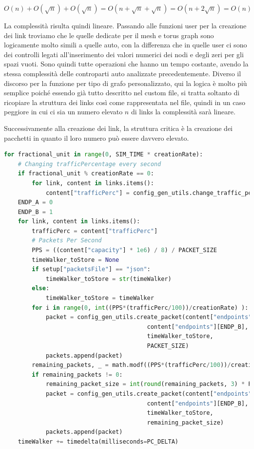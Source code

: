 \documentclass[binding=0.6cm]{sapthesis}
\begin{document}
\[
    O(n) + O(\sqrt{n}) + O(\sqrt{n}) = O(n + \sqrt{n} + \sqrt{n}) = O(n + 2\sqrt{n}) = O(n)
\]

La complessità risulta quindi lineare.
Passando alle funzioni user per la creazione dei link troviamo che le quelle dedicate per il mesh e torus graph sono logicamente molto simili a quelle auto, con
la differenza che in quelle user ci sono dei controlli legati all'inserimento dei valori numerici dei nodi e degli zeri per gli spazi vuoti. Sono quindi tutte operazioni che hanno un tempo costante,
avendo la stessa complessità delle controparti auto analizzate precedentemente.
Diverso il discorso per la funzione per tipo di grafo personalizzato, qui la logica è molto più semplice
poiché essendo già tutto descritto nel custom file, si tratta soltanto di ricopiare la struttura dei links così come rappresentata nel file,
quindi in un caso peggiore in cui ci sia un numero elevato \(n\) di links la complessità sarà lineare.

Successivamente alla creazione dei link, la struttura critica è la creazione dei pacchetti in quanto il loro numero può essere davvero elevato.

{\scriptsize
\begin{lstlisting}[language=Python, basicstyle=\ttfamily, caption={Logica creazione pacchetti}, label={codice:create_packets}, breaklines=true]
for fractional_unit in range(0, SIM_TIME * creationRate):
    # Changing trafficPercentage every second
    if fractional_unit % creationRate == 0:
        for link, content in links.items():
            content["trafficPerc"] = config_gen_utils.change_traffic_perc(content["trafficPerc"], setup["trafficVariation"])
    ENDP_A = 0
    ENDP_B = 1
    for link, content in links.items():
        trafficPerc = content["trafficPerc"]
        # Packets Per Second
        PPS = ((content["capacity"] * 1e6) / 8) / PACKET_SIZE
        timeWalker_toStore = None
        if setup["packetsFile"] == "json":
            timeWalker_toStore = str(timeWalker)
        else:
            timeWalker_toStore = timeWalker
        for i in range(0, int((PPS*(trafficPerc/100))/creationRate) ):
            packet = config_gen_utils.create_packet(content["endpoints"][ENDP_A],
                                         content["endpoints"][ENDP_B],
                                         timeWalker_toStore,
                                         PACKET_SIZE)
            packets.append(packet)
        remaining_packets, _ = math.modf((PPS*(trafficPerc/100))/creationRate)
        if remaining_packets != 0:
            remaining_packet_size = int(round(remaining_packets, 3) * PACKET_SIZE)
            packet = config_gen_utils.create_packet(content["endpoints"][ENDP_A],
                                         content["endpoints"][ENDP_B],
                                         timeWalker_toStore,
                                         remaining_packet_size)
            packets.append(packet)
    timeWalker += timedelta(milliseconds=PC_DELTA)
\end{lstlisting}
}
\end{document}
